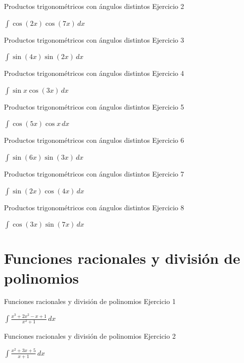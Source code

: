 \documentclass[10pt,aspectratio=169]{beamer}
\newcommand{\ejercicio}[1]{%
  \begin{center}
  \vfill
  {\fontsize{24}{30}\selectfont #1}
  \vfill
  \end{center}
}
\begin{document}
\begin{frame}{Productos trigonométricos con ángulos distintos}
\small Ejercicio 2
\ejercicio{$\displaystyle \int \cos(2x)\cos(7x)\,dx$}
\end{frame}

\begin{frame}{Productos trigonométricos con ángulos distintos}
\small Ejercicio 3
\ejercicio{$\displaystyle \int \sin(4x)\sin(2x)\,dx$}
\end{frame}

\begin{frame}{Productos trigonométricos con ángulos distintos}
\small Ejercicio 4
\ejercicio{$\displaystyle \int \sin x\cos(3x)\,dx$}
\end{frame}

\begin{frame}{Productos trigonométricos con ángulos distintos}
\small Ejercicio 5
\ejercicio{$\displaystyle \int \cos(5x)\cos x\,dx$}
\end{frame}

\begin{frame}{Productos trigonométricos con ángulos distintos}
\small Ejercicio 6
\ejercicio{$\displaystyle \int \sin(6x)\sin(3x)\,dx$}
\end{frame}

\begin{frame}{Productos trigonométricos con ángulos distintos}
\small Ejercicio 7
\ejercicio{$\displaystyle \int \sin(2x)\cos(4x)\,dx$}
\end{frame}

\begin{frame}{Productos trigonométricos con ángulos distintos}
\small Ejercicio 8
\ejercicio{$\displaystyle \int \cos(3x)\sin(7x)\,dx$}
\end{frame}

\section{Funciones racionales y división de polinomios}

\begin{frame}{Funciones racionales y división de polinomios}
\small Ejercicio 1
\ejercicio{$\displaystyle \int \frac{x^3+2x^2-x+1}{x^2+1}\,dx$}
\end{frame}

\begin{frame}{Funciones racionales y división de polinomios}
\small Ejercicio 2
\ejercicio{$\displaystyle \int \frac{x^2+3x+5}{x+1}\,dx$}
\end{frame}
\end{document}
